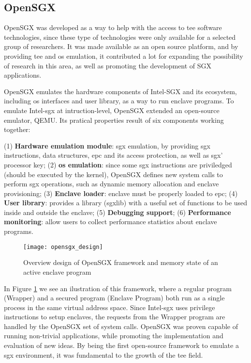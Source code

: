 \subsection{OpenSGX}
\label{ssec:openSGX}

OpenSGX \cite{opensgx_paper} was developed as a way to help with the access to \gls{tee} software technologies, since these type of technologies were only available for a selected group of researchers. 
It was made available as an open source platform, and by providing \gls{tee} and \gls{os} emulation, it contributed a lot for expanding the possibility of research in this area, as well as promoting the development of SGX applications. 

OpenSGX emulates the hardware components of Intel-SGX and its ecosystem, including \gls{os} interfaces and user library, as a way to run enclave programs. To emulate Intel-\gls{sgx} at intruction-level, OpenSGX extended an open-source emulator, QEMU.
Its pratical properties result of six components working together: 

(1) \textbf{Hardware emulation module}: \gls{sgx} emulation, by providing \gls{sgx} instructions, data structures, \gls{epc} and its access protection, as well as \gls{sgx}' processor key; 
(2) \textbf{\gls{os} emulation}: since some \gls{sgx} instructions are priviledged (should be executed by the kernel), OpenSGX defines new system calls to perform \gls{sgx} operations, such as dynamic memory allocation and enclave provisioning; 
(3) \textbf{Enclave loader}: enclave must be properly loaded to \gls{epc}; 
(4) \textbf{User library}: provides a library (sgxlib) with a useful set of functions to be used inside and outside the enclave; 
(5) \textbf{Debugging support}; 
(6) \textbf{Performance monitoring}: allow users to collect performance statistics about enclave programs.

\begin{figure}[htbp]
	\centering
	{\texttt{[image: opensgx\_design]}}
	\caption{Overview design of OpenSGX framework and memory state of an active enclave program}
	\label{fig:openSGXDesign}
\end{figure}

In Figure \ref{fig:openSGXDesign} we see an ilustration of this framework, where a regular program (Wrapper) and a secured program (Enclave Program) both run as a single process in the same virtual address space. Since Intel-\gls{sgx} uses privilege instructions to setup enclaves, the requests from the Wrapper program are handled by the OpenSGX set of system calls.
OpenSGX was proven capable of running non-trivial applications, while promoting the implementation and evaluation of new ideas. By being the first open-source framework to emulate a \gls{sgx} environment, it was  fundamental to the growth of the \gls{tee} field.



